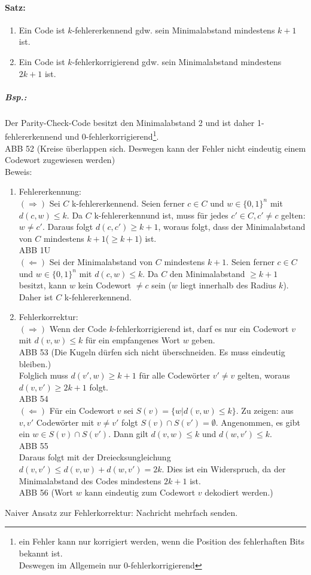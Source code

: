\paragraph{Satz:}
\begin{enumerate}
\item Ein Code ist $k$-fehlererkennend gdw. sein Minimalabstand mindestens $k+1$ ist.
\item Ein Code ist $k$-fehlerkorrigierend gdw. sein Minimalabstand mindestens $2k+1$ ist.
\end{enumerate} 

\subparagraph{Bsp.:} Der Parity-Check-Code besitzt den Minimalabstand 2 und ist daher 1-fehlererkennend und 0-fehlerkorrigierend\footnote{ein Fehler kann nur korrigiert werden, wenn die Position des fehlerhaften Bits bekannt ist. \\
Deswegen im Allgemein nur 0-fehlerkorrigierend}.\\
ABB 52 (Kreise überlappen sich. Deswegen kann der Fehler nicht eindeutig einem Codewort zugewiesen werden)\\
Beweis:
\begin{enumerate}
\item Fehlererkennung:\\
$(\Rightarrow)$ Sei $C$ k-fehlererkennend. Seien ferner $c\in C$ und $w \in \{0,1\}^n$ mit $d(c,w)\leq k$. Da $C$ k-fehlererkennund ist, muss für jedes $c' \in C, c'\not = c$ gelten: $w \not = c'$. Daraus folgt $d(c,c') \geq k+1$, woraus folgt, dass der Minimalabstand von $C$ mindestens $k+1$($\geq k+1$) ist.\\
ABB 1U\\
$(\Leftarrow)$ Sei der Minimalabstand von $C$ mindestens $k+1$. Seien ferner $c\in C$ und $w \in \{0,1\}^n$ mit $d(c,w)\leq k$. Da $C$ den Minimalabstand $\geq k+1$ besitzt, kann $w$ kein Codewort $\not = c$ sein ($w$ liegt innerhalb des Radius $k$). Daher ist $C$ k-fehlererkennend. 

\item Fehlerkorrektur:\\
$(\Rightarrow)$ Wenn der Code $k$-fehlerkorrigierend ist, darf es nur ein Codewort $v$ mit $d(v,w)\leq k$ für ein empfangenes Wort $w$ geben.\\
ABB 53 (Die Kugeln dürfen sich nicht überschneiden. Es muss eindeutig bleiben.)\\
Folglich muss $d(v',w)\geq k+1$ für alle Codewörter $v'\not = v$ gelten, woraus $d(v,v')\geq 2k+1$ folgt.\\
ABB 54\\
$(\Leftarrow)$ Für ein Codewort $v$ sei $S(v)=\{w|d(v,w)\leq k\}$. Zu zeigen: aus $v,v'$ Codewörter mit $v\not = v'$ folgt $S(v) \cap S(v')=\emptyset$. Angenommen, es gibt ein $w \in S(v)\cap S(v')$. Dann gilt $d(v,w)\leq k$ und $d(w,v') \leq k$.\\
ABB 55\\
Daraus folgt mit der Dreiecksungleichung $d(v,v')\leq d(v,w)+d(w,v')=2k$. Dies ist ein Widerspruch, da der Minimalabstand des Codes mindestens $2k+1$ ist.\\
ABB 56 (Wort $w$ kann eindeutig zum Codewort $v$ dekodiert werden.)
\end{enumerate}
Naiver Ansatz zur Fehlerkorrektur: Nachricht mehrfach senden.
